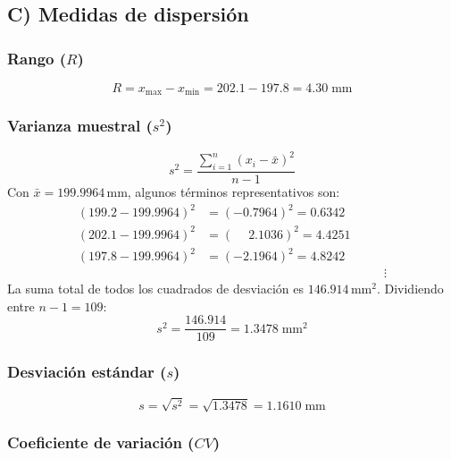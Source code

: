 \subsection{C) Medidas de dispersi\'on}

\subsubsection*{Rango ($R$)}

\[
R = x_{\max} - x_{\min} = 202.1 - 197.8 = 4.30\;\text{mm}
\]

\resultado[$R$ -- Rango]{\[ R = 4.30\;\text{mm} \]}

\subsubsection*{Varianza muestral ($s^2$)}

\[
s^2 = \frac{\displaystyle\sum_{i=1}^{n}(x_i - \bar{x})^2}{n-1}
\]
Con $\bar{x} = 199.9964$\,mm, algunos t\'erminos representativos son:
\begin{align*}
(199.2 - 199.9964)^2 &= (-0.7964)^2 = 0.6342 \\
(202.1 - 199.9964)^2 &= (\phantom{-}2.1036)^2 = 4.4251 \\
(197.8 - 199.9964)^2 &= (-2.1964)^2 = 4.8242 \\[-2pt]
                      &\hspace{6cm}\vdots
\end{align*}
La suma total de todos los cuadrados de desviaci\'on es $146.914$\,mm$^2$.
Dividiendo entre $n - 1 = 109$:
\[
s^2 = \frac{146.914}{109} = 1.3478\;\text{mm}^2
\]

\resultado[$s^2$ -- Varianza]{\[ s^2 = 1.3478\;\text{mm}^2 \]}

\subsubsection*{Desviaci\'on est\'andar ($s$)}

\[
s = \sqrt{s^2} = \sqrt{1.3478} = 1.1610\;\text{mm}
\]


\subsubsection*{Coeficiente de variaci\'on ($CV$)}

